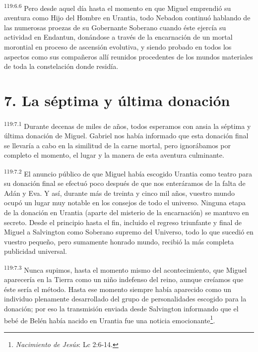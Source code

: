 \par
\textsuperscript{119:6.6} Pero desde aquel día hasta el momento en que Miguel emprendió su aventura como Hijo del Hombre en Urantia, todo Nebadon continuó hablando de las numerosas proezas de su Gobernante Soberano cuando éste ejercía su actividad en Endantun, donándose a través de la encarnación de un mortal morontial en proceso de ascensión evolutiva, y siendo probado en todos los aspectos como sus compañeros allí reunidos procedentes de los mundos materiales de toda la constelación donde residía.

\section*{7. La séptima y última donación}
\par
\textsuperscript{119:7.1} Durante decenas de miles de años, todos esperamos con ansia la séptima y última donación de Miguel. Gabriel nos había informado que esta donación final se llevaría a cabo en la similitud de la carne mortal, pero ignorábamos por completo el momento, el lugar y la manera de esta aventura culminante.

\par
\textsuperscript{119:7.2} El anuncio público de que Miguel había escogido Urantia como teatro para su donación final se efectuó poco después de que nos enteráramos de la falta de Adán y Eva. Y así, durante más de treinta y cinco mil años, vuestro mundo ocupó un lugar muy notable en los consejos de todo el universo. Ninguna etapa de la donación en Urantia (aparte del misterio de la encarnación) se mantuvo en secreto. Desde el principio hasta el fin, incluido el regreso triunfante y final de Miguel a Salvington como Soberano supremo del Universo, todo lo que sucedió en vuestro pequeño, pero sumamente honrado mundo, recibió la más completa publicidad universal.

\par
\textsuperscript{119:7.3} Nunca supimos, hasta el momento mismo del acontecimiento, que Miguel aparecería en la Tierra como un niño indefenso del reino, aunque creíamos que éste sería el método. Hasta ese momento siempre había aparecido como un individuo plenamente desarrollado del grupo de personalidades escogido para la donación; por eso la transmisión enviada desde Salvington informando que el bebé de Belén había nacido en Urantia fue una noticia emocionante\footnote{\textit{Nacimiento de Jesús}: Lc 2:6-14.}.

